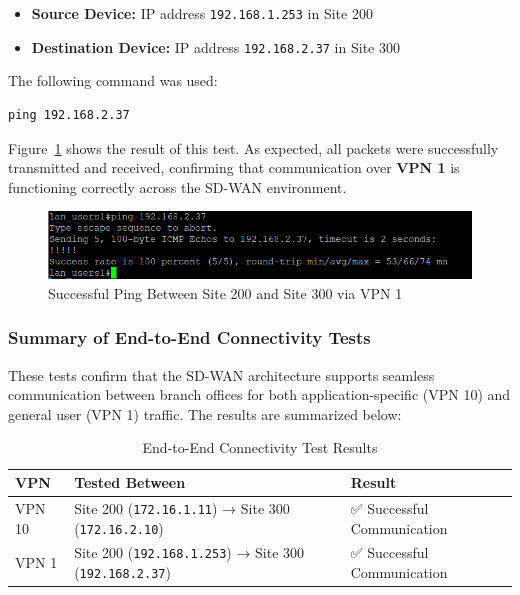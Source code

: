 \documentclass[12pt,english]{report}
\begin{document}
\begin{itemize}
    \item \textbf{Source Device:} IP address \texttt{192.168.1.253} in Site 200
    \item \textbf{Destination Device:} IP address \texttt{192.168.2.37} in Site 300
\end{itemize}
The following command was used:

\begin{lstlisting}[style=BashStyle]
ping 192.168.2.37
\end{lstlisting}

Figure~\ref{fig:end_to_end_vpn1} shows the result of this test. As expected, all packets were successfully transmitted and received, confirming that communication over \textbf{VPN 1} is functioning correctly across the SD-WAN environment.

\begin{figure}[H]
    \centering
    \includegraphics[width=1\linewidth]{chapter 4/end-conn-vpn1.png}
    \caption{Successful Ping Between Site 200 and Site 300 via VPN 1}
    \label{fig:end_to_end_vpn1}
\end{figure}

\subsubsection{Summary of End-to-End Connectivity Tests}

These tests confirm that the SD-WAN architecture supports seamless communication between branch offices for both application-specific (VPN 10) and general user (VPN 1) traffic. The results are summarized below:

\begin{table}[h]
\centering
\footnotesize
\caption{End-to-End Connectivity Test Results}
\label{tab:end_to_end_tests}
\begin{tabularx}{\linewidth}{@{}>{\centering\arraybackslash}p{2cm}>{\raggedright\arraybackslash}p{6cm}>{\raggedright\arraybackslash}X@{}}
\toprule
\textbf{VPN} & \textbf{Tested Between} & \textbf{Result} \\
\midrule
VPN 10 & Site 200 (\texttt{172.16.1.11}) → Site 300 (\texttt{172.16.2.10}) & ✅ Successful Communication \\
\midrule
VPN 1 & Site 200 (\texttt{192.168.1.253}) → Site 300 (\texttt{192.168.2.37}) & ✅ Successful Communication \\
\bottomrule
\end{tabularx}
\end{table}
\end{document}
